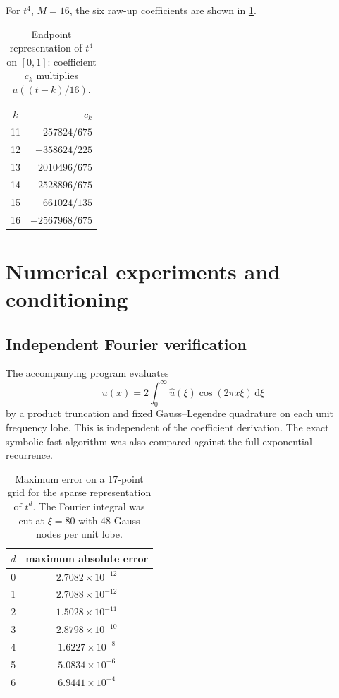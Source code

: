 \documentclass[11pt,oneside]{article}
\theoremstyle{definition}
\theoremstyle{remark}
\newcommand{\dd}{\,\mathrm d}
\begin{document}
For $t^4$, $M=16$, the six raw-up coefficients are shown in \cref{tab:d4}.
\begin{table}[htbp]
\centering
\caption{Endpoint representation of $t^4$ on $[0,1]$: coefficient $c_k$ multiplies $u((t-k)/16)$.}
\label{tab:d4}
\begin{tabular}{cr}
\toprule
$k$ & $c_k$\\
\midrule
11 & $257824/675$\\
12 & $-358624/225$\\
13 & $2010496/675$\\
14 & $-2528896/675$\\
15 & $661024/135$\\
16 & $-2567968/675$\\
\bottomrule
\end{tabular}
\end{table}

\section{Numerical experiments and conditioning}
\label{sec:numerics}

\subsection{Independent Fourier verification}
The accompanying program evaluates
\begin{equation}
 u(x)=2\int_0^\infty\widehat u(\xi)
 \cos(2\pi x\xi)\dd\xi                                   \label{eq:inverse-fourier-num}
\end{equation}
by a product truncation and fixed Gauss--Legendre quadrature on each unit frequency lobe.  This is independent of the coefficient derivation.  The exact symbolic fast algorithm was also compared against the full exponential recurrence.

\begin{table}[htbp]
\centering
\caption{Maximum error on a 17-point grid for the sparse representation of $t^d$.  The Fourier integral was cut at $\xi=80$ with 48 Gauss nodes per unit lobe.}
\label{tab:numerical-errors}
\begin{tabular}{cc}
\toprule
$d$ & maximum absolute error\\
\midrule
0 & $2.7082\times10^{-12}$\\
1 & $2.7088\times10^{-12}$\\
2 & $1.5028\times10^{-11}$\\
3 & $2.8798\times10^{-10}$\\
4 & $1.6227\times10^{-8}$\\
5 & $5.0834\times10^{-6}$\\
6 & $6.9441\times10^{-4}$\\
\bottomrule
\end{tabular}
\end{table}
\end{document}
